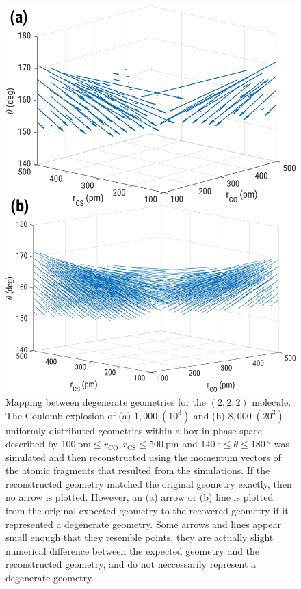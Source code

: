 \begin{figure}
  \centering
  \includegraphics[width=\textwidth]{Plots/OCS222DegeneracyMap}
  \caption[Mapping between degenerate geometries for the  $(2,2,2)$ molecule.]
  {Mapping between degenerate geometries for the  $(2,2,2)$ molecule. The Coulomb explosion of (a) $1,000 \; (10^3)$ and (b) $8,000 \; (20^3)$ uniformly distributed geometries within a box in phase space described by $\SI{100}{\pico\meter} \le r_\mathrm{CO}, r_\mathrm{CS} \le \SI{500}{\pico\meter}$ and $\SI{140}{\degree} \le \theta \le \SI{180}{\degree}$ was simulated and then reconstructed using the momentum vectors of the atomic fragments that resulted from the simulations. If the reconstructed geometry matched the original geometry exactly, then no arrow is plotted. However, an (a) arrow or (b) line is plotted from the original expected geometry to the recovered geometry if it represented a degenerate geometry. Some arrows and lines appear small enough that they resemble points, they are actually slight numerical difference between the expected geometry and the reconstructed geometry, and do not neccessarily represent a degenerate geometry.}
  \label{fig:OCS222DegeneracyMaps}
\end{figure}

